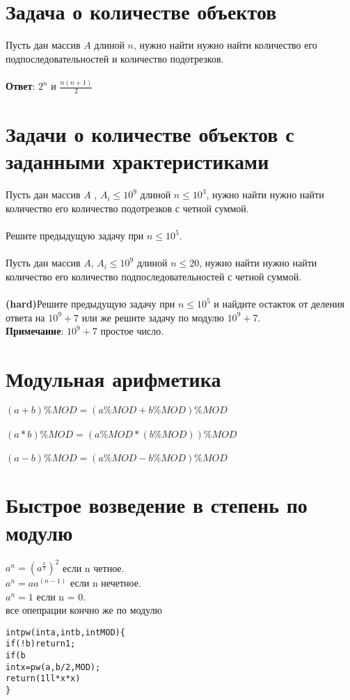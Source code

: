 \documentclass[12pt]{article}
\begin{document}
    \section{Задача о количестве объектов}
    
    Пусть дан массив $A$ длиной $n$, нужно найти нужно найти количество его  подпоследовательностей и количество подотрезков.
    \\
    \\
    \textbf{Ответ}: $2^n$ и $\frac{n(n + 1)}{2}$
    
    
    \section{Задачи о количестве объектов с заданными храктеристиками}
    
    Пусть дан массив $A$ , $A_i \leq 10^9$ длиной $n \leq {10^3}$, нужно найти нужно найти количество его  количество подотрезков с четной суммой.
    \\
    \\
    Решите предыдущую задачу при $n \leq {10^5}$.
    \\
    \\
    Пусть дан массив $A$, $A_i \leq 10^9$ длиной $n \leq {20}$, нужно найти нужно найти количество его  количество подпоследовательностей с четной суммой.
    \\
    \\
    \textbf{(hard)}Решите предыдущую задачу при $n \leq {10^5}$ и найдите остакток от деления ответа на $10^9 + 7$ или же решите задачу по модулю $10^9 + 7$.
    \\
    \textbf{Примечание}:  $10^9 + 7$ простое число.
    \section{Модульная арифметика}
        $(a + b)\%MOD = (a\%MOD + b\%MOD)\%MOD$
        \\
        \\
        $(a * b)\%MOD = (a\%MOD * (b\%MOD))\%MOD$
        \\
        \\
        $(a - b)\%MOD = (a\%MOD - b\%MOD)\%MOD$
        
    \section{Быстрое возведение в степень по модулю}
        $a ^ n = {(a ^ \frac{n}{2})}^ 2$ если n четное.
        \\
        $a ^ n = {a  a ^ {(n - 1)}}$ если n нечетное.
        \\
        $a^n = 1$ если n = 0.
        \\
        все опепрации кончно же по модулю
    \begin{alltt}
int pw(int a, int b, int MOD)\{
    if(!b) return 1;
    if(b % 2) return (1ll * a * pw(a ,  b - 1 , MOD)) % MOD;
    int x = pw(a , b / 2, MOD);
    return (1ll * x * x) % MOD;
\}
    \end{alltt}
    
\end{document}
